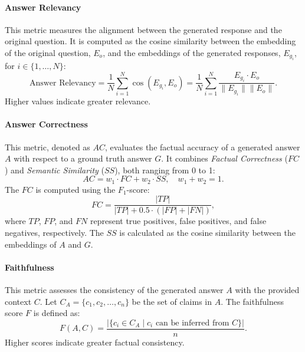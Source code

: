 \paragraph{Answer Relevancy}
This metric measures the alignment between the generated response and the original question.
%
It is computed as the cosine similarity between the embedding of the original question, \(E_o\), and the embeddings of the generated responses, \(E_{g_i}\), for \(i \in \{1, \dots, N\}\):
%
\begin{equation}
    \label{eq:answer-relevancy}
    \text{Answer Relevancy} = \frac{1}{N} \sum_{i=1}^{N} \cos(E_{g_i}, E_o) = \frac{1}{N} \sum_{i=1}^{N} \frac{E_{g_i} \cdot E_o}{\|E_{g_i}\| \|E_o\|}.
\end{equation}
%
Higher values indicate greater relevance.

\paragraph{Answer Correctness}
This metric, denoted as \(AC\), evaluates the factual accuracy of a generated answer \(A\) with respect to a ground truth answer \(G\).
%
It combines \textit{Factual Correctness} (\(FC\)) and \textit{Semantic Similarity} (\(SS\)), both ranging from 0 to 1:
%
\begin{equation}
    \label{eq:answer-correctness}
    AC = w_1 \cdot FC + w_2 \cdot SS, \quad w_1 + w_2 = 1.
\end{equation}
%
The \(FC\) is computed using the \(F_1\)-score:
%
\begin{equation}
    \label{eq:factual-correctness}
    FC = \frac{|TP|}{|TP| + 0.5 \cdot (|FP| + |FN|)},
\end{equation}
%
where \(TP\), \(FP\), and \(FN\) represent true positives, false positives, and false negatives, respectively.
%
The \(SS\) is calculated as the cosine similarity between the embeddings of \(A\) and \(G\).

\paragraph{Faithfulness}
This metric assesses the consistency of the generated answer \(A\) with the provided context \(C\).
%
Let \(C_A = \{c_1, c_2, \dots, c_n\}\) be the set of claims in \(A\).
%
The faithfulness score \(F\) is defined as:
%
\begin{equation}
    \label{eq:faithfulness}
    F(A, C) = \frac{|\{c_i \in C_A \mid c_i \text{ can be inferred from } C\}|}{n}.
\end{equation}
%
Higher scores indicate greater factual consistency.

